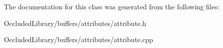 The documentation for this class was generated from the following files\+:\begin{DoxyCompactItemize}
\item 
Occluded\+Library/buffers/attributes/attribute.\+h\item 
Occluded\+Library/buffers/attributes/attribute.\+cpp\end{DoxyCompactItemize}
